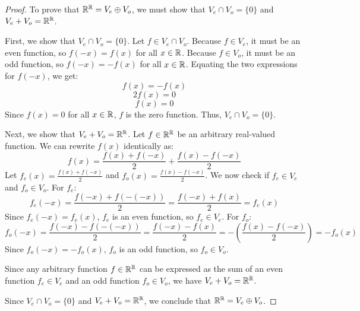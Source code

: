 \begin{proof}
	To prove that $\mathbb{R}^{\mathbb{R}} = V_e \oplus V_o$, we must show that $V_e \cap V_o = \{0\}$ and $V_e + V_o = \mathbb{R}^{\mathbb{R}}$.
	
	First, we show that $V_e \cap V_o = \{0\}$. Let $f \in V_e \cap V_o$. 
	Because $f \in V_e$, it must be an even function, so $f(-x) = f(x)$ for all $x \in \mathbb{R}$.
	Because $f \in V_o$, it must be an odd function, so $f(-x) = -f(x)$ for all $x \in \mathbb{R}$.
	Equating the two expressions for $f(-x)$, we get:
	\[ f(x) = -f(x) \]
	\[ 2f(x) = 0 \]
	\[ f(x) = 0 \]
	Since $f(x) = 0$ for all $x \in \mathbb{R}$, $f$ is the zero function. Thus, $V_e \cap V_o = \{0\}$.
	
	Next, we show that $V_e + V_o = \mathbb{R}^{\mathbb{R}}$. Let $f \in \mathbb{R}^{\mathbb{R}}$ be an arbitrary real-valued function. 
	We can rewrite $f(x)$ identically as:
	\[ f(x) = \frac{f(x) + f(-x)}{2} + \frac{f(x) - f(-x)}{2} \]
	Let $f_e(x) = \frac{f(x) + f(-x)}{2}$ and $f_o(x) = \frac{f(x) - f(-x)}{2}$. 
	We now check if $f_e \in V_e$ and $f_o \in V_o$. 
	For $f_e$:
	\[ f_e(-x) = \frac{f(-x) + f(-(-x))}{2} = \frac{f(-x) + f(x)}{2} = f_e(x) \]
	Since $f_e(-x) = f_e(x)$, $f_e$ is an even function, so $f_e \in V_e$.
	For $f_o$:
	\[ f_o(-x) = \frac{f(-x) - f(-(-x))}{2} = \frac{f(-x) - f(x)}{2} = -\left(\frac{f(x) - f(-x)}{2}\right) = -f_o(x) \]
	Since $f_o(-x) = -f_o(x)$, $f_o$ is an odd function, so $f_o \in V_o$.
	
	Since any arbitrary function $f \in \mathbb{R}^{\mathbb{R}}$ can be expressed as the sum of an even function $f_e \in V_e$ and an odd function $f_o \in V_o$, we have $V_e + V_o = \mathbb{R}^{\mathbb{R}}$.
	
	Since $V_e \cap V_o = \{0\}$ and $V_e + V_o = \mathbb{R}^{\mathbb{R}}$, we conclude that $\mathbb{R}^{\mathbb{R}} = V_e \oplus V_o$.
\end{proof}
